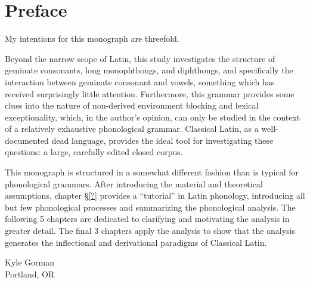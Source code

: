 \chapter*{Preface}

My intentions for this monograph are threefold.

Beyond the narrow scope of Latin, this study investigates the structure of geminate consonants, long monophthongs, and diphthongs, and specifically the interaction between geminate consonant and vowels, something which has received surprisingly little attention.
Furthermore, this grammar provides some clues into the nature of non-derived environment blocking and lexical exceptionality, which, in the author's opinion, can only be studied in the context of a relatively exhaustive phonological grammar.
Classical Latin, as a well-documented dead language, provides the ideal tool for investigating these questions: a large, carefully edited closed corpus.

This monograph is structured in a somewhat different fashion than is typical for phonological grammars.
After introducing the material and theoretical assumptions, chapter \S\ref{?} provides a ``tutorial'' in Latin phonology, introducing all but few phonological processes and summarizing the phonological analysis.
The following 5 chapters are dedicated to clarifying and motivating the analysis in greater detail.
The final 3 chapters apply the analysis to show that the analysis generates the inflectional and derivational paradigms of Classical Latin.

\noindent Kyle Gorman \\ Portland, OR

